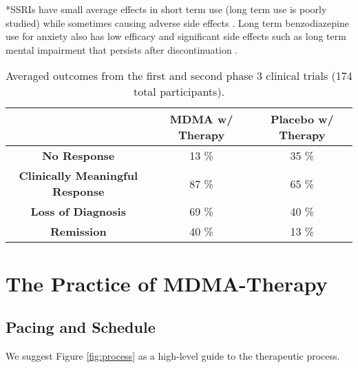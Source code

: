 \documentclass[12pt,letterpaper]{article}
\begin{document}
*SSRIs have small average effects in short term use (long term use is poorly studied) while sometimes causing adverse side effects \cite{ciprianiSSRI,bregginWithdrawal}. Long term benzodiazepine use for anxiety also has low efficacy and significant side effects such as long term mental impairment that persists after discontinuation \cite{shinfukuBenzo,barkerBenzo}.  
\FloatBarrier
\begin{table}[h!]
    \centering
    \caption{Averaged outcomes from the first and second phase 3 clinical trials (174 total participants)\cite{mitchellMDMAClinicalTrial,mitchellMDMAClinicalTrial2}.}
    \label{table:efficacy}
    \begin{tabular}{|c|c|c|}
    \hline
     & \textbf{MDMA w/ Therapy} & \textbf{Placebo w/ Therapy} \\ \hline
    \textbf{No Response}          & 13 \%          & 35 \%          \\ \hline
    \textbf{Clinically Meaningful Response}          & 87 \%          & 65 \%         \\ \hline
    \textbf{Loss of Diagnosis} & 69 \% & 40 \% \\ \hline
    \textbf{Remission}          & 40 \%          & 13 \%          \\ \hline
    \end{tabular}
\end{table}
\FloatBarrier
{}
\section{The Practice of MDMA-Therapy}
\subsection{Pacing and Schedule}
\noindent We suggest Figure \ref{fig:process} as a high-level guide to the therapeutic process.
\end{document}

